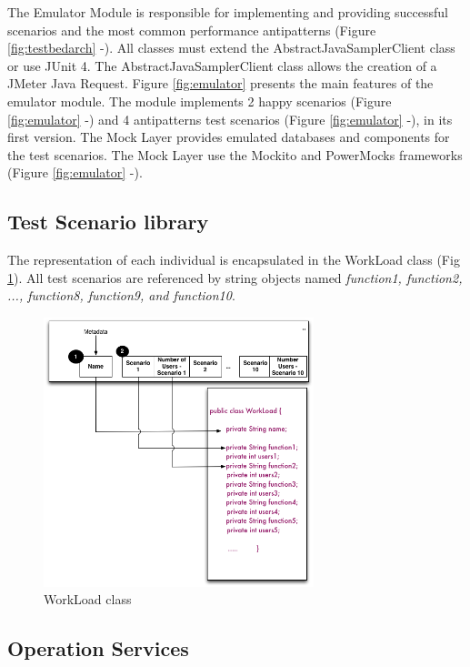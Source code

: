 \documentclass[espaco=umemeio,chapter=TITLE,twoside,openright]{abnt}
\begin{document}
The Emulator Module is responsible for implementing and providing successful scenarios and the most common performance antipatterns (Figure \ref{fig:testbedarch}  -). All classes must extend the AbstractJavaSamplerClient class or use JUnit 4. The AbstractJavaSamplerClient class allows the creation of a JMeter Java Request. Figure \ref{fig:emulator} presents the main features of the emulator module. The module implements 2 happy scenarios (Figure \ref{fig:emulator}  -) and  4 antipatterns test scenarios (Figure \ref{fig:emulator}  -), in its first version. The Mock Layer provides emulated databases and components for the test scenarios. The Mock Layer use the Mockito and PowerMocks frameworks (Figure \ref{fig:emulator}  -).

\subsection{Test Scenario library}

The representation of each individual is encapsulated in the WorkLoad class (Fig \ref{fig:genomeimpl}). All test scenarios are referenced by string objects named \textit{function1, function2, ..., function8, function9, and function10}.


\begin{figure}[!h]
\centering
\includegraphics[width=0.7\textwidth]{./images/genomeimpl.png}
\caption{WorkLoad class}
\label{fig:genomeimpl}
\end{figure}


\subsection{Operation Services}
\end{document}
